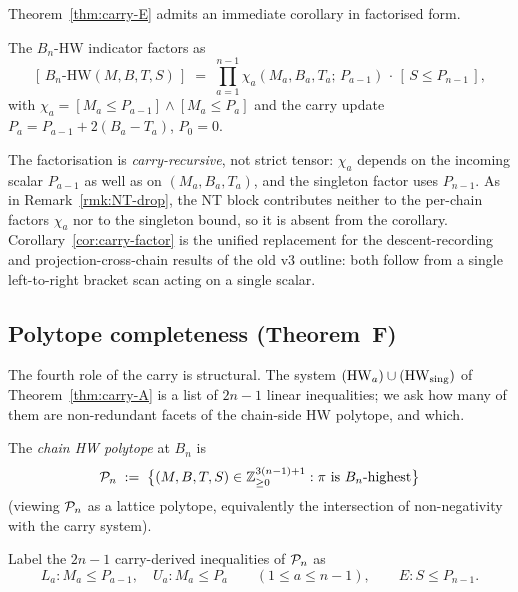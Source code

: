 Theorem~\ref{thm:carry-E} admits an immediate corollary in factorised form.

\begin{corollary}\label{cor:carry-factor}
The $B_n$-HW indicator factors as
\[
   [\,B_n\text{-HW}(M, B, T, S)\,]
   \;=\; \prod_{a=1}^{n-1} \chi_a(M_a, B_a, T_a;\, P_{a-1}) \,\cdot\, [\,S \le P_{n-1}\,],
\]
with $\chi_a = [M_a \le P_{a-1}] \wedge [M_a \le P_a]$ and the carry update
$P_a = P_{a-1} + 2(B_a - T_a)$, $P_0 = 0$.
\end{corollary}

The factorisation is \emph{carry-recursive}, not strict tensor: $\chi_a$ depends
on the incoming scalar $P_{a-1}$ as well as on $(M_a, B_a, T_a)$, and the
singleton factor uses $P_{n-1}$. As in Remark~\ref{rmk:NT-drop}, the NT block
contributes neither to the per-chain factors $\chi_a$ nor to the singleton
bound, so it is absent from the corollary. Corollary~\ref{cor:carry-factor} is
the unified replacement for the descent-recording and projection-cross-chain
results of the old v3 outline: both follow from a single left-to-right bracket
scan acting on a single scalar.

\subsection{Polytope completeness (Theorem~F)}\label{ssec:carry-polytope}

The fourth role of the carry is structural. The system $(\mathrm{HW}_a) \cup
(\mathrm{HW}_{\mathrm{sing}})$ of Theorem~\ref{thm:carry-A} is a list of $2n - 1$ linear
inequalities; we ask how many of them are non-redundant facets of the
chain-side HW polytope, and which.

\begin{definition}\label{def:chain-polytope}
The \emph{chain HW polytope} at $B_n$ is
\[
   \mathcal{P}_n \;:=\; \bigl\{ (M, B, T, S) \in \mathbb{Z}_{\ge 0}^{3(n-1) + 1} : \pi \text{ is } B_n\text{-highest} \bigr\}
\]
(viewing $\mathcal{P}_n$ as a lattice polytope, equivalently the intersection of
non-negativity with the carry system).
\end{definition}

Label the $2n - 1$ carry-derived inequalities of $\mathcal{P}_n$ as
\[
   L_a : M_a \le P_{a-1}, \quad U_a : M_a \le P_a \qquad (1 \le a \le n - 1),
   \qquad E : S \le P_{n-1}.
\]

